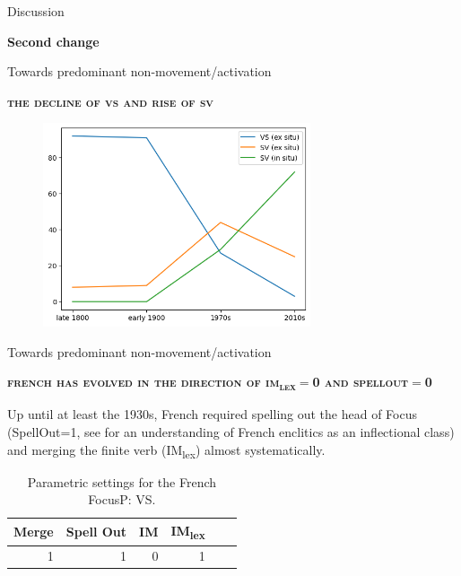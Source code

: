 \documentclass[lesson_slides]{subfiles}
\begin{document}
\begin{frame}[c]{Discussion}
    
\begin{center}
    \textbf{Second change}
\end{center}
  
\end{frame}

\begin{frame}[c]{Towards predominant non-movement/activation}

    \textbf{\textsc{the decline of vs and rise of sv}}
    \begin{center}
        \includegraphics[width=10cm, height=6cm]{images/exsituinsitu.png}
    \end{center}
  
\end{frame}
\begin{frame}[c]{Towards predominant non-movement/activation}

    \textbf{\textsc{french has evolved in the direction of im\textsubscript{lex}$=$0 and spellout$=$0}} \pause

    \noindent Up until at least the 1930s, French required spelling out the head of Focus (SpellOut=1, see \citealt{roberts2017} for an understanding of French enclitics as an inflectional class) and merging the finite verb (IM\textsubscript{lex}) almost systematically. \pause

    \begin{table}[H]
        \centering
        \begin{tabular}{|r|r|r|r|r|r|}
        \hline
        Merge & Spell Out & IM  & IM\textsubscript{lex} \\
        \hline
        1 & 1 & 0 & 1 \\
        \hline
        \end{tabular}
        \caption{\label{tab:samp}Parametric settings for the French FocusP: VS.}
    \end{table}
  
\end{frame}
\end{document}
